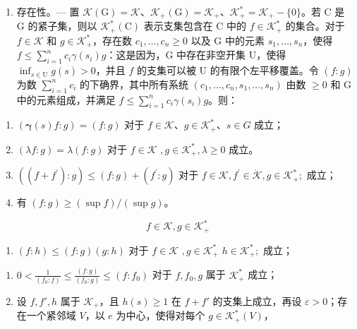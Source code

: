 \begin{enumerate}
\def\labelenumi{\Alph{enumi})}
\tightlist
\item
  存在性。--- 置 \(\mathcal{K}(\mathrm{G}) = \mathcal{K}\)、\(\mathcal{K}_{+}(\mathrm{G}) = \mathcal{K}_{+}\)、\(\mathcal{K}_{+}^{*} = \mathcal{K}_{+} - \{0\}\)。若 C 是 G 的紧子集，则以 \(\mathcal{K}_{+}^{*}(\mathrm{C})\) 表示支集包含在 C 中的 \(f \in \mathcal{K}_{+}^{*}\) 的集合。对于 \(f \in \mathcal{K}\) 和 \(g \in \mathcal{K}_{+}^{*}\)，存在数 \(c_{1}, \ldots, c_{n} \geqslant 0\) 以及 G 中的元素 \(s_{1}, \ldots, s_{n}\)，使得 \(f \leqslant \sum_{i=1}^{n} c_{i} \gamma(s_{i}) g\)：这是因为，G 中存在非空开集 U，使得 \(\inf_{s \in \mathrm{U}} g(s) > 0\)，并且 \(f\) 的支集可以被 U 的有限个左平移覆盖。令 \((f : g)\) 为数 \(\sum_{i=1}^{n} c_{i}\) 的下确界，其中所有系统 \((c_{1}, \ldots, c_{n}, s_{1}, \ldots, s_{n})\) 由数 \(\geqslant 0\) 和 G 中的元素组成，并满足 \(f \leqslant \sum_{i=1}^{n} c_{i} \gamma(s_{i}) g\)。则：
\end{enumerate}

\begin{enumerate}
\def\labelenumi{(\roman{enumi})}
\item
  \(\left(\pmb{\gamma}(s)f:g\right) = (f:g)\) 对于 \(f\in \mathcal{K}\)、\(g\in \mathcal{K}_{+}^{*}\)、\(s\in G\) 成立；
\item
  \((\lambda f:g) = \lambda (f:g)\) 对于 \(f\in \mathcal{K}\) \(,g\in \mathcal{K}_{+}^{*},\lambda \geqslant 0\) 成立。
\item
  \(\left((f + f^{\prime}):g\right)\leqslant (f:g) + (f^{\prime}:g)\) 对于 \(f\in \mathcal{K},f^{\prime}\in \dot{\mathcal{K}},g\in \mathcal{K}_{+}^{*};\) 成立；
\item
  有 \((f:g)\geqslant (\sup f) / (\sup g)\)。
\end{enumerate}

\[
f \in \mathscr {K}, g \in \mathscr {K} _ {+} ^ {*}
\]

\begin{enumerate}
\def\labelenumi{(\alph{enumi})}
\setcounter{enumi}{21}
\tightlist
\item
  \((f:h)\leqslant (f:g)(g:h)\) 对于 \(f\in \mathcal{K}\) \(,g\in \mathcal{K}_{+}^{*}\) \(h\in \mathcal{K}_{+}^{*};\) 成立；
\end{enumerate}

\begin{enumerate}
\def\labelenumi{(\roman{enumi})}
\setcounter{enumi}{5}
\item
  \(0 < \frac{1}{(f_0:f)}\leqslant \frac{(f:g)}{(f_0:g)}\leqslant (f:f_0)\) 对于 \(f,f_0,g\) 属于 \(\mathcal{K}_+^*\) 成立；
\item
  设 \(f, f', h\) 属于 \(\mathcal{K}_+\)，且 \(h(s) \geqslant 1\) 在 \(f + f'\) 的支集上成立，再设 \(\varepsilon > 0\)；存在一个紧邻域 \(V\)，以 \(e\) 为中心，使得对每个 \(g \in \mathcal{K}_+^*(V)\)，
\end{enumerate}

